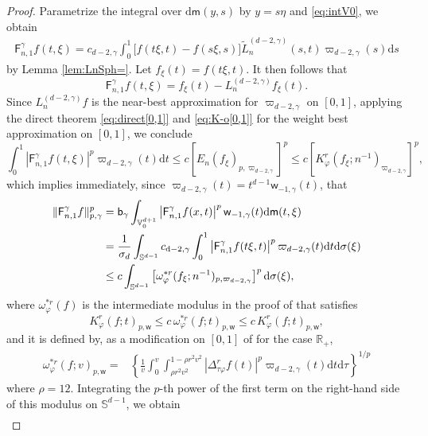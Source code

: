 \documentclass{amsart}
\theoremstyle{remark}
\def\d{\mathrm{d}}
\def\sph{{\mathbb{S}^{d-1}}}
\def\g{{\gamma}}
\def\o{{\omega}}
\def\s{\sigma}
\def\RR{{\mathbb R}}
\def\VV{{\mathbb V}}
\def\d{\mathrm{d}}
\def\sph{{\mathbb{S}^{d-1}}}
\def\sF{{\mathsf F}}
\def\sL{{\mathsf L}}
\def\sb{{\mathsf b}}
\def\sm{{\mathsf m}}
\def\sw{{\mathsf w}}
\def\g{{\gamma}}
\def\o{{\omega}}
\def\s{\sigma}
\def\RR{{\mathbb R}}
\def\VV{{\mathbb V}}
\newcommand{\wt}{\widetilde}
\begin{document}
\begin{proof} 
Parametrize the integral over $\d \sm(y,s)$ by $y = s\eta$ and \eqref{eq:intV0}, we obtain
\begin{align*}
\sF_{n,1}^\g f(t,\xi) %
  =  c_{d-2, \g} \int_0^1 \big[ f(t\xi,t) -f(s\xi, s)\big] \wt L_n^{(d-2,\g)}(s,t)  \varpi_{d-2,\g}(s) \d s 
\end{align*}
by Lemma \ref{lem:LnSph=}. Let $f_\xi(t) = f(t\xi,t)$. It then follows that 
$$
\sF_{n,1}^\g f (t,\xi) =  f_\xi (t) - L_n^{(d-2,\g)}f_\xi(t). 
$$
Since $L_n^{(d-2,\g)}f$ is the near-best approximation for $\varpi_{d-2,\g}$ on $[0,1]$, applying the direct theorem 
\eqref{eq:direct[0,1]} and \eqref{eq:K-o[0,1]} for the weight best approximation on $[0,1]$, we conclude 
$$
  \int_0^1 |\sF_{n,1}^\g f (t,\xi)|^p \varpi_{d-2,\g}(t) \d t \le c  \left[ E_n(f_\xi)_{p, \varpi_{d-2,\g}} \right]^p 
     \le c \left[ K_\varphi^r(f_\xi; n^{-1})_{ \varpi_{d-2,\g}} \right ]^p, 
$$
which implies immediately, since $\varpi_{d-2,\g}(t) = t^{d-1} \sw_{-1,\g}(t)$, that  
\begin{align} \label{eq:Fn1-tem}
  \|\sF_{n,1}^\g f \|_{p,\g}^p & = \sb_\g  \int_{\VV_0^{d+1}}  \left | \sF_{n,1}^\g f(x,t) \right |^p \sw_{-1,\g}(t) \d \sm(t,\xi) \\
 & = \frac{1}{\s_d} \int_{\sph} c_{\d-2,\g} \int_0^1 \left| \sF_{n,1}^\g f(t\xi,t)\right |^p \varpi_{d-2,\g}(t) \d t \d \s(\xi) \notag \\
 & \le c \int_{\sph}   \left[ \o_\varphi^{*r}(f_\xi; n^{-1})_{p,\varpi_{d-2,\g}} \right ]^p \d \s(\xi), \notag
\end{align}
where $\o_{\varphi}^{*r}(f)$ is the intermediate modulus in the proof of \cite[Theorem 6.1.1]{DT} that satisfies 
$$
K_\varphi^r(f;t)_{p, \sw} \le c\,\o_\varphi^{*r}(f;t)_{p, \sw} \le  c\,K_\varphi^{r}(f;t)_{p, \sw},
$$ 
and it is defined by, as a modification on $[0,1]$ of \cite[(6.1.9)]{DT} for the case $\RR_+$, 
\begin{align*}
 \o_{\varphi}^{*r} (f; v)_{p, \sw} = & \left\{ \frac1 v  \int_0^v \int_{\rho {r^2v^2}}^{1- \rho r^2 v^2}
      \left | \Delta_{\tau\varphi}^r f(t) \right |^p 
      \varpi_{d-2,\g}(t)\d t \d \tau \right \}^{1/p}  
\end{align*}
where $\rho =12$. Integrating the $p$-th power of the first term on the right-hand side of this modulus on $\sph$,
we obtain
\begin{align*}

\end{align*}
\end{proof}
\end{document}
